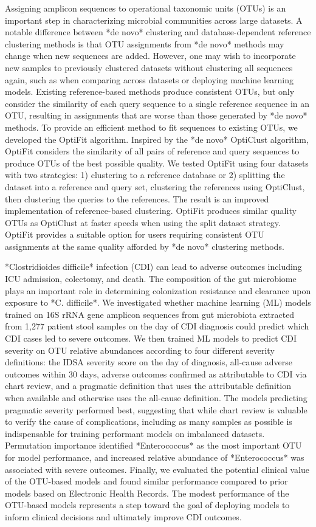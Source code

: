 

Assigning amplicon sequences to operational taxonomic units (OTUs) is an
important step in characterizing microbial communities across large
datasets. A notable difference between *de novo* clustering and
database-dependent reference clustering methods is that OTU assignments
from *de novo* methods may change when new sequences are added. However,
one may wish to incorporate new samples to previously clustered datasets
without clustering all sequences again, such as when comparing across
datasets or deploying machine learning models. Existing reference-based
methods produce consistent OTUs, but only consider the similarity of
each query sequence to a single reference sequence in an OTU, resulting
in assignments that are worse than those generated by *de novo* methods.
To provide an efficient method to fit sequences to existing OTUs, we
developed the OptiFit algorithm. Inspired by the *de novo* OptiClust
algorithm, OptiFit considers the similarity of all pairs of reference
and query sequences to produce OTUs of the best possible quality. We
tested OptiFit using four datasets with two strategies: 1) clustering to
a reference database or 2) splitting the dataset into a reference and
query set, clustering the references using OptiClust, then clustering
the queries to the references. The result is an improved implementation
of reference-based clustering. OptiFit produces similar quality OTUs as
OptiClust at faster speeds when using the split dataset strategy.
OptiFit provides a suitable option for users requiring consistent OTU
assignments at the same quality afforded by *de novo* clustering
methods.

*Clostridioides difficile* infection (CDI) can lead to adverse outcomes
including ICU admission, colectomy, and death. The composition of the
gut microbiome plays an important role in determining colonization
resistance and clearance upon exposure to *C. difficile*. We
investigated whether machine learning (ML) models trained on 16S rRNA
gene amplicon sequences from gut microbiota extracted from 1,277 patient
stool samples on the day of CDI diagnosis could predict which CDI cases
led to severe outcomes. We then trained ML models to predict CDI
severity on OTU relative abundances according to four different severity
definitions: the IDSA severity score on the day of diagnosis, all-cause
adverse outcomes within 30 days, adverse outcomes confirmed as
attributable to CDI via chart review, and a pragmatic definition that
uses the attributable definition when available and otherwise uses the
all-cause definition. The models predicting pragmatic severity performed
best, suggesting that while chart review is valuable to verify the cause
of complications, including as many samples as possible is indispensable
for training performant models on imbalanced datasets. Permutation
importance identified *Enterococcus* as the most important OTU for model
performance, and increased relative abundance of *Enterococcus* was
associated with severe outcomes. Finally, we evaluated the potential
clinical value of the OTU-based models and found similar performance
compared to prior models based on Electronic Health Records. The modest
performance of the OTU-based models represents a step toward the goal of
deploying models to inform clinical decisions and ultimately improve CDI
outcomes.
